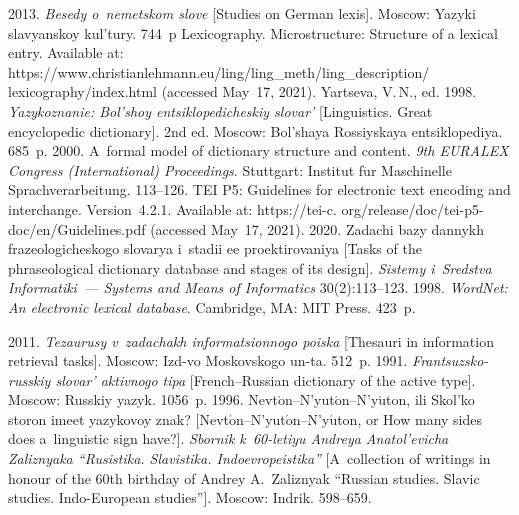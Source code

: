 \begin{multicols}{2}
{{\begin{thebibliography}{99}
{}
 2013. \textit{Besedy o~nemetskom slove} [Studies on 
German lexis]. Moscow: Yazyki slavyanskoy kul'tury. 744~p
 Lexicography. Microstructure: Structure of a lexical entry. 
Available at: {\sf 
https://www.\linebreak christianlehmann.eu/ling/ling\_meth/ling\_description/\linebreak
lexicography/index.html} (accessed May~17, 2021).
Yartseva, V.\,N., ed. 1998. \textit{Yazykoznanie: Bol'shoy entsiklopedicheskiy 
slovar'} [Linguistics. Great encyclopedic dictionary]. 2nd ed. Moscow: Bol'shaya 
Rossiyskaya entsiklopediya. 685~p.
 2000. A~formal model of dictionary 
structure and content. \textit{9th EURALEX
Congress (International) 
Proceedings}. Stuttgart: Institut f$\ddot{\mbox{u}}$r Maschinelle 
Sprachverarbeitung. 113--126.
TEI P5: Guidelines for electronic text encoding and interchange. Version~4.2.1. 
Available at: {\sf https://tei-c. org/release/doc/tei-p5-doc/en/Guidelines.pdf} 
(accessed May~17, 2021).
 2020. Zadachi bazy dannykh fra\-ze\-o\-lo\-gi\-che\-sko\-go slovarya 
i~stadii ee proektirovaniya [Tasks of the phraseological dictionary database and 
stages of its design]. \textit{Sistemy i~Sredstva Informatiki~--- Systems and Means 
of Informatics} 30(2):113--123.
 1998. \textit{WordNet: An electronic lexical database}. 
Cambridge, MA: MIT Press. 423~p.

\columnbreak

  2011. \textit{Tezaurusy v~zadachakh 
informatsionnogo poiska} [Thesauri in information retrieval tasks]. Moscow:  
Izd-vo Moskovskogo un-ta. 512~p.
 1991. \textit{Frantsuzsko-russkiy slovar' 
aktivnogo tipa} [French--Russian dictionary of the active type]. Moscow: Russkiy 
yazyk. 1056~p.
 1996.  
Nevt$\acute{\mbox{o}}$n--N'yut$\acute{\mbox{o}}$n--N'y$\acute{\mbox{u}}$ton, ili Skol'ko 
storon imeet yazykovoy znak?  
[Nevt$\acute{\mbox{o}}$n--N'yut$\acute{\mbox{o}}$n--N'y$\acute{\mbox{u}}$ton, or How many sides 
does a~linguistic sign have?]. \textit{Sbornik k~60-letiyu Andreya Anatol'evicha\linebreak 
Zaliznyaka ``Rusistika. Slavistika. Indoevropeistika''} [A~collection of writings in 
honour of the 60th birthday of Andrey A.~Zaliznyak ``Russian studies. 
Slavic studies. Indo-European studies'']. Moscow: Indrik. 598--659.
{

}
\end{thebibliography}

 }
 }

\end{multicols}

